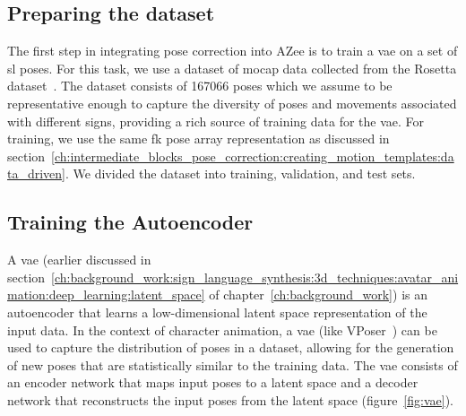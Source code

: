 \documentclass[../../main.tex]{subfiles}
\begin{document}
\subsection{Preparing the dataset}
\label{ch:intermediate_blocks_pose_correction:pose_correction_with_azee:dataset}

The first step in integrating pose correction into AZee is to train a \gls{vae} on a set of \gls{sl} poses. For this task, we use a dataset of \gls{mocap} data collected from the Rosetta dataset~\cite{bertin2022rosetta}. The dataset consists of 167066 poses which we assume to be representative enough to capture the diversity of poses and movements associated with different signs, providing a rich source of training data for the \gls{vae}. For training, we use the same \gls{fk} pose array representation as discussed in section~\ref{ch:intermediate_blocks_pose_correction:creating_motion_templates:data_driven}. We divided the dataset into training, validation, and test sets.

\subsection{Training the Autoencoder}
\label{ch:intermediate_blocks_pose_correction:pose_correction_with_azee:training}

A \gls{vae} (earlier discussed in section~\ref{ch:background_work:sign_language_synthesis:3d_techniques:avatar_animation:deep_learning:latent_space} of chapter~\ref{ch:background_work}) is an autoencoder that learns a low-dimensional latent space representation of the input data. In the context of character animation, a \gls{vae} (like VPoser~\cite{pavlakos2019expressive}) can be used to capture the distribution of poses in a dataset, allowing for the generation of new poses that are statistically similar to the training data. The \gls{vae} consists of an encoder network that maps input poses to a latent space and a decoder network that reconstructs the input poses from the latent space (figure~\ref{fig:vae}).
\end{document}
